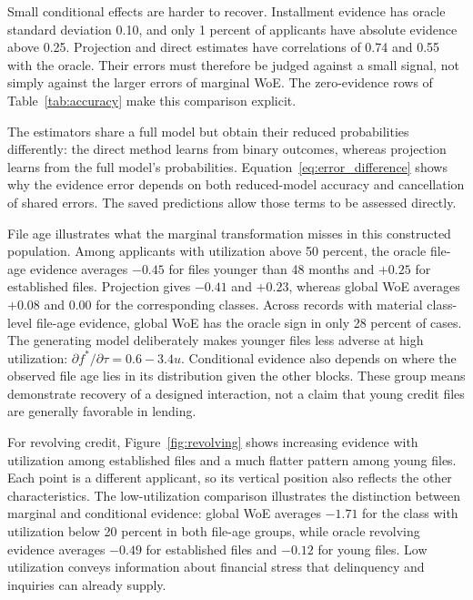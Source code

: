 Small conditional effects are harder to recover. Installment evidence has oracle standard deviation 0.10, and only 1 percent of applicants have absolute evidence above 0.25. Projection and direct estimates have correlations of 0.74 and 0.55 with the oracle. Their errors must therefore be judged against a small signal, not simply against the larger errors of marginal WoE. The zero-evidence rows of Table~\ref{tab:accuracy} make this comparison explicit.

The estimators share a full model but obtain their reduced probabilities differently: the direct method learns from binary outcomes, whereas projection learns from the full model's probabilities. Equation~\eqref{eq:error_difference} shows why the evidence error depends on both reduced-model accuracy and cancellation of shared errors. The saved predictions allow those terms to be assessed directly.



File age illustrates what the marginal transformation misses in this constructed population. Among applicants with utilization above 50 percent, the oracle file-age evidence averages $-0.45$ for files younger than 48 months and $+0.25$ for established files. Projection gives $-0.41$ and $+0.23$, whereas global WoE averages $+0.08$ and $0.00$ for the corresponding classes. Across records with material class-level file-age evidence, global WoE has the oracle sign in only 28 percent of cases. The generating model deliberately makes younger files less adverse at high utilization: $\partial f^\ast/\partial\tau=0.6-3.4u$. Conditional evidence also depends on where the observed file age lies in its distribution given the other blocks. These group means demonstrate recovery of a designed interaction, not a claim that young credit files are generally favorable in lending.

For revolving credit, Figure~\ref{fig:revolving} shows increasing evidence with utilization among established files and a much flatter pattern among young files. Each point is a different applicant, so its vertical position also reflects the other characteristics. The low-utilization comparison illustrates the distinction between marginal and conditional evidence: global WoE averages $-1.71$ for the class with utilization below 20 percent in both file-age groups, while oracle revolving evidence averages $-0.49$ for established files and $-0.12$ for young files. Low utilization conveys information about financial stress that delinquency and inquiries can already supply.

